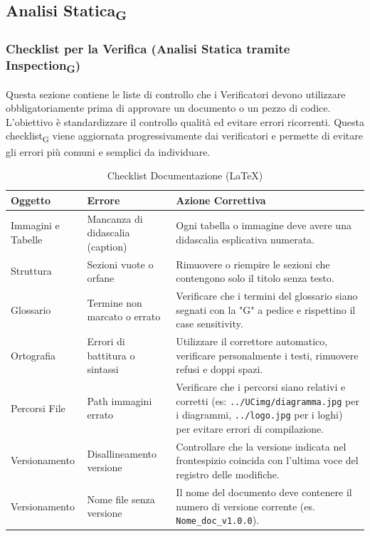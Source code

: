 \documentclass[11pt,a4paper]{article}
\begin{document}
\subsection{Analisi Statica\textsubscript{G}}

\subsubsection{Checklist per la Verifica (Analisi Statica tramite Inspection\textsubscript{G})}
Questa sezione contiene le liste di controllo che i Verificatori devono utilizzare obbligatoriamente prima di approvare un documento o un pezzo di codice. L'obiettivo è standardizzare il controllo qualità ed evitare errori ricorrenti.
Questa checklist\textsubscript{G} viene aggiornata progressivamente dai verificatori e permette di evitare gli errori più comuni e semplici da individuare.

\begin{table}[H]
    \centering
    \renewcommand{\arraystretch}{1.4}
    \begin{tabular}{|l|>{\raggedright\arraybackslash}p{}|>{\raggedright\arraybackslash}p{}|}
        \hline
        \textbf{Oggetto} & \textbf{Errore} & \textbf{Azione Correttiva} \\
        \hline
        Immagini e Tabelle & Mancanza di didascalia (caption) & Ogni tabella o immagine deve avere una didascalia esplicativa numerata. \\
        \hline
        Struttura & Sezioni vuote o orfane & Rimuovere o riempire le sezioni che contengono solo il titolo senza testo. \\
        \hline
        Glossario & Termine non marcato o errato & Verificare che i termini del glossario siano segnati con la "G" a pedice e rispettino il case sensitivity. \\
        \hline
        Ortografia & Errori di battitura o sintassi & Utilizzare il correttore automatico, verificare personalmente i testi, rimuovere refusi e doppi spazi. \\
        \hline
        Percorsi File & Path immagini errato & Verificare che i percorsi siano relativi e corretti (es: \texttt{../UCimg/diagramma.jpg} per i diagrammi, \texttt{../logo.jpg} per i loghi) per evitare errori di compilazione.\\
        \hline
        Versionamento & Disallineamento versione & Controllare che la versione indicata nel frontespizio coincida con l'ultima voce del registro delle modifiche. \\
        \hline
        Versionamento & Nome file senza versione & Il nome del documento deve contenere il numero di versione corrente (es. \texttt{Nome\_doc\_v1.0.0}). \\
        \hline
    \end{tabular}
    \caption{Checklist Documentazione (LaTeX)}
\end{table}
\end{document}
